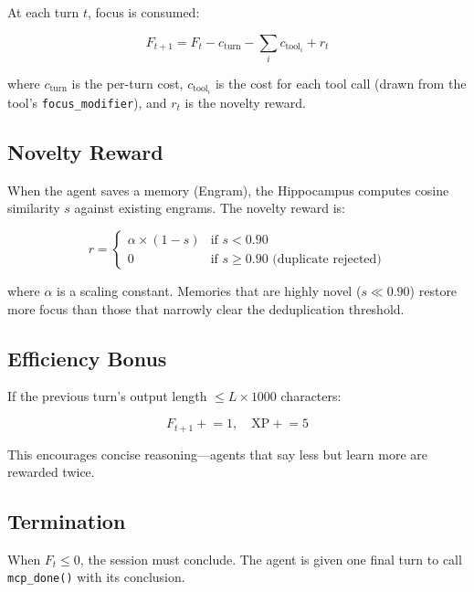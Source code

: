 \documentclass[man,12pt,floatsintext]{apa7}
\begin{document}
At each turn $t$, focus is consumed:

\begin{equation}
  F_{t+1} = F_t - c_{\text{turn}} - \sum_{i} c_{\text{tool}_i} + r_t
\end{equation}

where $c_{\text{turn}}$ is the per-turn cost, $c_{\text{tool}_i}$ is the cost for each
tool call (drawn from the tool's \texttt{focus\_modifier}), and $r_t$ is the novelty
reward.

\subsection{Novelty Reward}

When the agent saves a memory (Engram), the Hippocampus computes cosine similarity
$s$ against existing engrams. The novelty reward is:

\begin{equation}
  r = \begin{cases}
    \alpha \times (1 - s) & \text{if } s < 0.90 \\
    0 & \text{if } s \geq 0.90 \text{ (duplicate rejected)}
  \end{cases}
\end{equation}

where $\alpha$ is a scaling constant. Memories that are highly novel ($s \ll 0.90$)
restore more focus than those that narrowly clear the deduplication threshold.

\subsection{Efficiency Bonus}

If the previous turn's output length $\leq L \times 1000$ characters:

\begin{equation}
  F_{t+1} \mathrel{+}= 1, \quad \text{XP} \mathrel{+}= 5
\end{equation}

This encourages concise reasoning---agents that say less but learn more are rewarded
twice.

\subsection{Termination}

When $F_t \leq 0$, the session must conclude. The agent is given one final turn to
call \texttt{mcp\_done()} with its conclusion.
\end{document}
